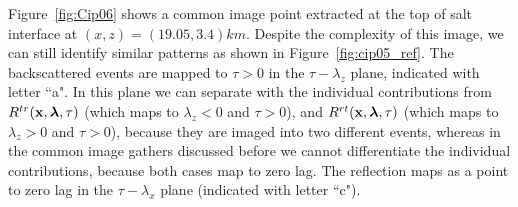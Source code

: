 Figure~\ref{fig:Cip06} shows a common image point extracted at the top of salt interface at $(x,z)=(19.05,3.4)km$. Despite the complexity of this image, we can still
identify similar patterns as shown in Figure~\ref{fig:cip05_ref}. The backscattered events are mapped to $\tau>0$ in the
$\tau-\lambda_z$ plane, indicated with letter ``a". In this plane we can separate with the individual contributions 
from $R^{tr}({\bf x},{\boldsymbol{\lambda}},\tau)$ (which maps to $\lambda_z<0$ and $\tau>0$), and $R^{rt}({\bf x},{\boldsymbol{\lambda}},\tau)$ (which maps to $\lambda_z>0$ and $\tau>0$), because they are imaged into two different events, 
whereas in the common image gathers discussed before we cannot differentiate the individual
contributions, because both cases map to zero lag. The reflection maps as a point to zero lag in the $\tau-\lambda_x$ plane (indicated with letter ``c"). 

